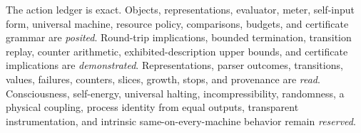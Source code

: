 The action ledger is exact.  Objects, representations, evaluator, meter, self-input form, universal machine, resource
policy, comparisons, budgets, and certificate grammar are \emph{posited}.  Round-trip implications, bounded
termination, transition replay, counter arithmetic, exhibited-description upper bounds, and certificate implications
are \emph{demonstrated}.  Representations, parser outcomes, transitions, values, failures, counters, slices, growth,
stops, and provenance are \emph{read}.  Consciousness, self-energy, universal halting, incompressibility, randomness,
a physical coupling, process identity from equal outputs, transparent instrumentation, and intrinsic
same-on-every-machine behavior remain \emph{reserved}.
